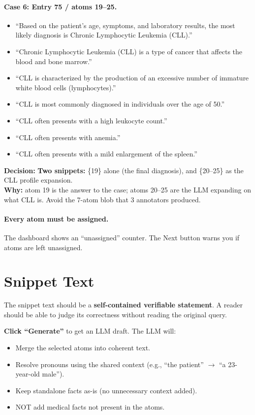 \documentclass{article}
\begin{document}
\paragraph{Case 6: Entry 75 / atoms 19--25.}
\begin{itemize}[leftmargin=1.8em,labelsep=0.5em,itemsep=2pt,topsep=3pt]
    \item[\textit{atom 19:}] ``Based on the patient's age, symptoms, and laboratory results, the most likely diagnosis is Chronic Lymphocytic Leukemia (CLL).''
    \item[\textit{atom 20:}] ``Chronic Lymphocytic Leukemia (CLL) is a type of cancer that affects the blood and bone marrow.''
    \item[\textit{atom 21:}] ``CLL is characterized by the production of an excessive number of immature white blood cells (lymphocytes).''
    \item[\textit{atom 22:}] ``CLL is most commonly diagnosed in individuals over the age of 50.''
    \item[\textit{atom 23:}] ``CLL often presents with a high leukocyte count.''
    \item[\textit{atom 24:}] ``CLL often presents with anemia.''
    \item[\textit{atom 25:}] ``CLL often presents with a mild enlargement of the spleen.''
\end{itemize}
\noindent\textbf{Decision:} \textbf{Two snippets:} \{19\} alone (the final diagnosis), and \{20--25\} as the CLL profile expansion. \\
\noindent\textbf{Why:} atom 19 is the answer to the case; atoms 20--25 are the LLM expanding on what CLL is. Avoid the 7-atom blob that 3 annotators produced.

\medskip
\paragraph{Every atom must be assigned.}
The dashboard shows an ``unassigned'' counter. The Next button warns you if atoms are left unassigned.


\section{Snippet Text}
\label{sec:snippet-text}

The snippet text should be a \textbf{self-contained verifiable statement}. A reader should be able to judge its correctness without reading the original query.

\textbf{Click ``Generate''} to get an LLM draft. The LLM will:
\begin{itemize}[leftmargin=*,itemsep=2pt]
    \item Merge the selected atoms into coherent text.
    \item Resolve pronouns using the shared context (e.g., ``the patient'' $\rightarrow$ ``a 23-year-old male'').
    \item Keep standalone facts as-is (no unnecessary context added).
    \item NOT add medical facts not present in the atoms.
\end{itemize}
\end{document}
